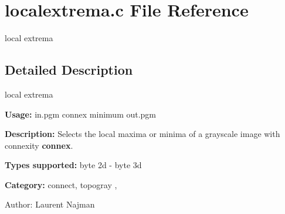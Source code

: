 \section{localextrema.c File Reference}
\label{localextrema_8c}
local extrema 



\subsection{Detailed Description}
local extrema 

{\bf Usage:} in.pgm connex minimum out.pgm

{\bf Description:} Selects the local maxima or minima of a grayscale image with connexity {\bf connex}.

{\bf Types supported:} byte 2d - byte 3d

{\bf Category:} connect, topogray ,

\begin{Desc}
\item[Author:]Laurent Najman \end{Desc}
